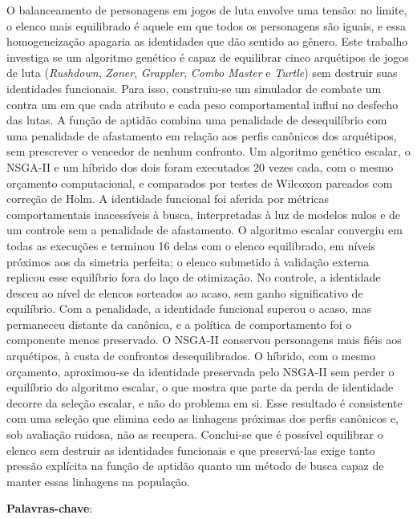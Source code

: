 \begin{resumo}
  \vspace{-15pt}

  O balanceamento de personagens em jogos de luta envolve uma tensão: no limite, o elenco mais equilibrado é aquele em que todos os personagens são iguais, e essa homogeneização apagaria as identidades que dão sentido ao gênero. Este trabalho investiga se um algoritmo genético é capaz de equilibrar cinco arquétipos de jogos de luta (\textit{Rushdown}, \textit{Zoner}, \textit{Grappler}, \textit{Combo Master} e \textit{Turtle}) sem destruir suas identidades funcionais. Para isso, construiu-se um simulador de combate um contra um em que cada atributo e cada peso comportamental influi no desfecho das lutas. A função de aptidão combina uma penalidade de desequilíbrio com uma penalidade de afastamento em relação aos perfis canônicos dos arquétipos, sem prescrever o vencedor de nenhum confronto. Um algoritmo genético escalar, o NSGA-II e um híbrido dos dois foram executados 20 vezes cada, com o mesmo orçamento computacional, e comparados por testes de Wilcoxon pareados com correção de Holm. A identidade funcional foi aferida por métricas comportamentais inacessíveis à busca, interpretadas à luz de modelos nulos e de um controle sem a penalidade de afastamento. O algoritmo escalar convergiu em todas as execuções e terminou 16 delas com o elenco equilibrado, em níveis próximos aos da simetria perfeita; o elenco submetido à validação externa replicou esse equilíbrio fora do laço de otimização. No controle, a identidade desceu ao nível de elencos sorteados ao acaso, sem ganho significativo de equilíbrio. Com a penalidade, a identidade funcional superou o acaso, mas permaneceu distante da canônica, e a política de comportamento foi o componente menos preservado. O NSGA-II conservou personagens mais fiéis aos arquétipos, à custa de confrontos desequilibrados. O híbrido, com o mesmo orçamento, aproximou-se da identidade preservada pelo NSGA-II sem perder o equilíbrio do algoritmo escalar, o que mostra que parte da perda de identidade decorre da seleção escalar, e não do problema em si. Esse resultado é consistente com uma seleção que elimina cedo as linhagens próximas dos perfis canônicos e, sob avaliação ruidosa, não as recupera. Conclui-se que é possível equilibrar o elenco sem destruir as identidades funcionais e que preservá-las exige tanto pressão explícita na função de aptidão quanto um método de busca capaz de manter essas linhagens na população.

  \textbf{Palavras-chave}: \palavraschaveemlinha
\end{resumo}


